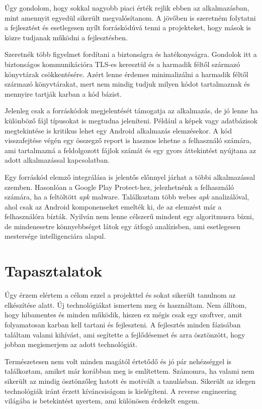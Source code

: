 \documentclass{thesis-ekf}
\theoremstyle{definition}
\theoremstyle{remark}
\begin{document}
Úgy gondolom, hogy sokkal nagyobb piaci érték rejlik ebben az alkalmazásban, mint amennyit egyedül sikerült megvalósítanom.
A jövőben is szeretném folytatni a fejlesztést és esetlegesen nyílt forráskódúvá tenni a projekteket, hogy mások is közre tudjanak működni a fejlesztésben.

Szeretnék több figyelmet fordítani a biztonságra és hatékonyságra. 
Gondolok itt a biztonságos kommunikációra TLS-es keresztül és a harmadik féltől származó könyvtárak csökkentésére.
Azért lenne érdemes minimalizálni a harmadik féltől származó könyvtárakat, mert nem mindig tudjuk milyen kódot tartalmaznak és mennyire tartják karban a kód bázist.

Jelenleg csak a forráskódok megjelentését támogatja az alkalmazás, de jó lenne ha különböző fájl típusokat is megtudna jeleníteni.
Például a képek vagy adatbázisok megtekintése is kritikus lehet egy Android alkalmazás elemzésekor.
A kód visszafejtése végén egy összegző report is hasznos lehetne a felhasználó számára, ami tartalmazná a feldolgozott fájlok számát és egy gyors áttekintést nyújtana az adott alkalmazással kapcsolatban.

Egy forráskód elemző integrálása is jelentős előnnyel járhat a többi alkalmazással szemben. Hasonlóan a Google Play Protect-hez, jelezhetnénk a felhasználó számára, ha a feltöltött \emph{apk} malware.
Találkoztam több webes \emph{apk} analizálóval, ahol csak az Android komponenseket emelték ki, de az elemzést már a felhasználóra bízták.
Nyilván nem lenne célszerű mindent egy algoritmusra bízni, de mindenesetre könnyebbséget látok egy átfogó analízisben, ami esetlegesen mestersége intelligenciára alapul.

\chapter{Tapasztalatok}\label{tapasztalatok}

Úgy érzem elértem a célom ezzel a projekttel és sokat sikerült tanulnom az elkészítése alatt.
Új technológiákat ismertem meg és használtam. Nem állítom, hogy hibamentes és minden működik, hiszen ez mégis csak egy szoftver, amit folyamatosan karban kell tartani és fejleszteni.
A fejlesztés minden fázisában találtam valami kihívást, ami segítette a fejlődésemet és arra ösztönzött, hogy jobban megismerjem az adott technológiát.

Természetesen nem volt minden magától értetődő és jó pár nehézséggel is találkoztam, amiket már korábban meg is említettem.
Számomra, ha valami nem sikerült az mindig ösztönzőleg hatott és motivált a tanulásban. Sikerült az idegen technológiák iránt érzett kíváncsiságom is kielégíteni.
A reverse engineering világába is betekintést nyertem, ami különösen érdekelt engem. 
\end{document}
